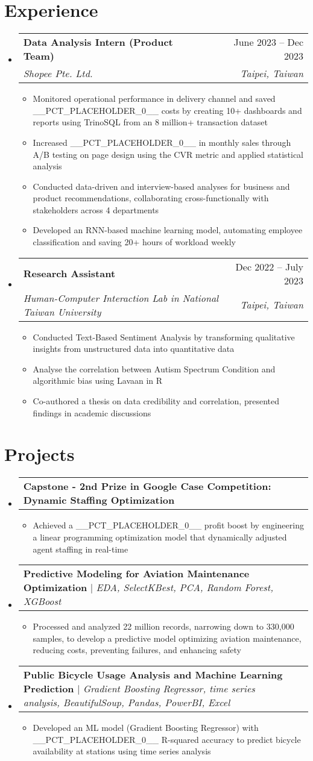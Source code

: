 \documentclass[letterpaper,11pt]{article}
\makeatletter
\newcommand{\resumeItem}[1]{
  \item\small{
    {#1 \vspace{-2pt}}
  }
}
\newcommand{\resumeSubheading}[4]{
  \vspace{-2pt}\item
    \begin{tabular*}{0.97\textwidth}[t]{l@{\extracolsep{\fill}}r}
      \textbf{#1} & #2 \\
      \textit{\small#3} & \textit{\small #4} \\
    \end{tabular*}\vspace{-7pt}
}
\newcommand{\resumeProjectHeading}[2]{
    \item
    \begin{tabular*}{0.97\textwidth}{l@{\extracolsep{\fill}}r}
      \small#1 & #2 \\
    \end{tabular*}\vspace{-7pt}
}
\newcommand{\resumeSubHeadingListStart}{\begin{itemize}[leftmargin=0.15in, label={}]}
\newcommand{\resumeSubHeadingListEnd}{\end{itemize}}
\newcommand{\resumeItemListStart}{\begin{itemize}}
\newcommand{\resumeItemListEnd}{\end{itemize}\vspace{-8pt}}
\makeatother
\begin{document}
\section{Experience}
  \resumeSubHeadingListStart
    \resumeSubheading
      {Data Analysis Intern (Product Team)}{June 2023 -- Dec 2023}
      {Shopee Pte. Ltd.}{Taipei, Taiwan}
      \resumeItemListStart
        \resumeItem{Monitored operational performance in delivery channel and saved \_\_PCT\_PLACEHOLDER\_0\_\_ costs by creating 10+ dashboards and reports using TrinoSQL from an 8 million+ transaction dataset}
        \resumeItem{Increased \_\_PCT\_PLACEHOLDER\_0\_\_ in monthly sales through A/B testing on page design using the CVR metric and applied statistical analysis}
        \resumeItem{Conducted data-driven and interview-based analyses for business and product recommendations, collaborating cross-functionally with stakeholders across 4 departments}
        \resumeItem{Developed an RNN-based machine learning model, automating employee classification and saving 20+ hours of workload weekly}
      \resumeItemListEnd
    \resumeSubheading
      {Research Assistant}{Dec 2022 -- July 2023}
      {Human-Computer Interaction Lab in National Taiwan University}{Taipei, Taiwan}
      \resumeItemListStart
        \resumeItem{Conducted Text-Based Sentiment Analysis by transforming qualitative insights from unstructured data into quantitative data}
        \resumeItem{Analyse the correlation between Autism Spectrum Condition and algorithmic bias using Lavaan in R}
        \resumeItem{Co-authored a thesis on data credibility and correlation, presented findings in academic discussions}
      \resumeItemListEnd
  \resumeSubHeadingListEnd

\section{Projects}
    \resumeSubHeadingListStart
      \resumeProjectHeading
          {\textbf{Capstone - 2nd Prize in Google Case Competition: Dynamic Staffing Optimization}}{}
          \resumeItemListStart
            \resumeItem{Achieved a \_\_PCT\_PLACEHOLDER\_0\_\_ profit boost by engineering a linear programming optimization model that dynamically adjusted agent staffing in real-time}
          \resumeItemListEnd
      \resumeProjectHeading
          {\textbf{Predictive Modeling for Aviation Maintenance Optimization} $|$ \emph{EDA, SelectKBest, PCA, Random Forest, XGBoost}}{}
          \resumeItemListStart
            \resumeItem{Processed and analyzed 22 million records, narrowing down to 330,000 samples, to develop a predictive model optimizing aviation maintenance, reducing costs, preventing failures, and enhancing safety}
          \resumeItemListEnd
      \resumeProjectHeading
          {\textbf{Public Bicycle Usage Analysis and Machine Learning Prediction} $|$ \emph{Gradient Boosting Regressor, time series analysis, BeautifulSoup, Pandas, PowerBI, Excel}}{}
          \resumeItemListStart
            \resumeItem{Developed an ML model (Gradient Boosting Regressor) with \_\_PCT\_PLACEHOLDER\_0\_\_ R-squared accuracy to predict bicycle availability at stations using time series analysis}
          \resumeItemListEnd
    \resumeSubHeadingListEnd
\end{document}

